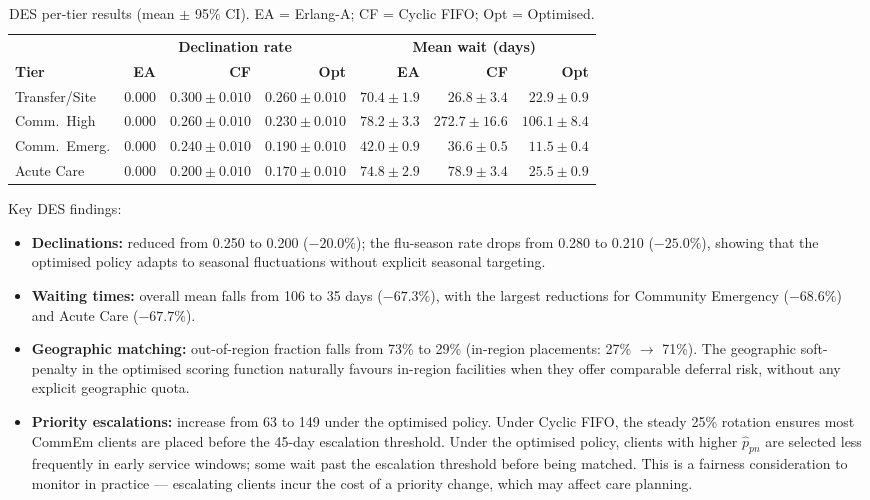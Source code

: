 \begin{table}[H]
\centering
\caption{DES per-tier results (mean $\pm$ 95\% CI).
         EA = Erlang-A; CF = Cyclic FIFO; Opt = Optimised.}
\label{tab:des_tier}
\begin{tabular}{lrrrrrr}
\toprule
& \multicolumn{3}{c}{\textbf{Declination rate}} & \multicolumn{3}{c}{\textbf{Mean wait (days)}} \\
\cmidrule(lr){2-4} \cmidrule(lr){5-7}
\textbf{Tier} & \textbf{EA} & \textbf{CF} & \textbf{Opt} & \textbf{EA} & \textbf{CF} & \textbf{Opt} \\
\midrule
Transfer/Site & 0.000 & $0.300 \pm 0.010$ & $0.260 \pm 0.010$ & $70.4 \pm 1.9$ & $26.8 \pm 3.4$ & $22.9 \pm 0.9$ \\
Comm.\ High   & 0.000 & $0.260 \pm 0.010$ & $0.230 \pm 0.010$ & $78.2 \pm 3.3$ & $272.7 \pm 16.6$ & $106.1 \pm 8.4$ \\
Comm.\ Emerg. & 0.000 & $0.240 \pm 0.010$ & $0.190 \pm 0.010$ & $42.0 \pm 0.9$ & $36.6 \pm 0.5$ & $11.5 \pm 0.4$ \\
Acute Care    & 0.000 & $0.200 \pm 0.010$ & $0.170 \pm 0.010$ & $74.8 \pm 2.9$ & $78.9 \pm 3.4$ & $25.5 \pm 0.9$ \\
\bottomrule
\end{tabular}
\end{table}

Key DES findings:
\begin{itemize}[noitemsep]
  \item \textbf{Declinations:} reduced from 0.250 to 0.200 ($-20.0\%$); the flu-season
        rate drops from 0.280 to 0.210 ($-25.0\%$), showing that the optimised policy
        adapts to seasonal fluctuations without explicit seasonal targeting.
  \item \textbf{Waiting times:} overall mean falls from 106 to 35 days ($-67.3\%$),
        with the largest reductions for Community Emergency ($-68.6\%$) and Acute Care
        ($-67.7\%$).
  \item \textbf{Geographic matching:} out-of-region fraction falls from 73\% to 29\%
        (in-region placements: 27\% $\to$ 71\%).  The geographic soft-penalty in the
        optimised scoring function naturally favours in-region facilities when they
        offer comparable deferral risk, without any explicit geographic quota.
  \item \textbf{Priority escalations:} increase from 63 to 149 under the optimised policy.
        Under Cyclic FIFO, the steady 25\% rotation ensures most CommEm clients are placed
        before the 45-day escalation threshold.  Under the optimised policy, clients with
        higher $\hat{p}_{pn}$ are selected less frequently in early service windows; some
        wait past the escalation threshold before being matched.  This is a fairness
        consideration to monitor in practice --- escalating clients incur the cost of a
        priority change, which may affect care planning.
\end{itemize}

